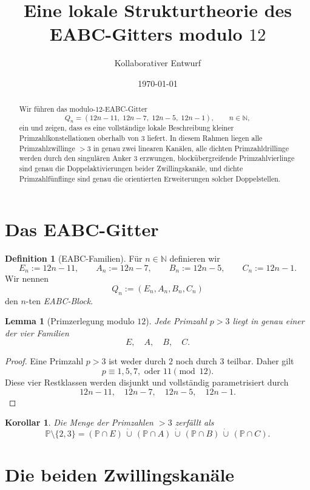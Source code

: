 \documentclass[11pt,a4paper]{article}
\title{Eine lokale Strukturtheorie des EABC-Gitters modulo \(12\)}
\author{Kollaborativer Entwurf}
\date{\today}
\newtheorem{lemma}[theorem]{Lemma}
\newtheorem{corollary}[theorem]{Korollar}
\theoremstyle{definition}
\newtheorem{definition}[theorem]{Definition}
\theoremstyle{remark}
\newcommand{\N}{\mathbb{N}}
\newcommand{\PP}{\mathbb{P}}
\begin{document}
	\maketitle
	
	\begin{abstract}
		Wir führen das modulo-\(12\)-EABC-Gitter
		\[
		Q_n=(12n-11,\;12n-7,\;12n-5,\;12n-1),
		\qquad n\in\N,
		\]
		ein und zeigen, dass es eine vollständige lokale Beschreibung kleiner Primzahlkonstellationen oberhalb von \(3\) liefert.
		In diesem Rahmen liegen alle Primzahlzwillinge \(>3\) in genau zwei linearen Kanälen, alle dichten Primzahldrillinge werden durch den singulären Anker \(3\) erzwungen, blockübergreifende Primzahlvierlinge sind genau die Doppelaktivierungen beider Zwillingskanäle, und dichte Primzahlfünflinge sind genau die orientierten Erweiterungen solcher Doppelstellen.
	\end{abstract}
	
	\section{Das EABC-Gitter}
	
	\begin{definition}[EABC-Familien]
		Für \(n\in\N\) definieren wir
		\[
		E_n:=12n-11,\qquad
		A_n:=12n-7,\qquad
		B_n:=12n-5,\qquad
		C_n:=12n-1.
		\]
		Wir nennen
		\[
		Q_n:=(E_n,A_n,B_n,C_n)
		\]
		den \(n\)-ten \emph{EABC-Block}.
	\end{definition}
	
	\begin{lemma}[Primzerlegung modulo \(12\)]
		Jede Primzahl \(p>3\) liegt in genau einer der vier Familien
		\[
		E,\quad A,\quad B,\quad C.
		\]
	\end{lemma}
	
	\begin{proof}
		Eine Primzahl \(p>3\) ist weder durch \(2\) noch durch \(3\) teilbar. Daher gilt
		\[
		p\equiv 1,5,7,\text{ oder }11 \pmod{12}.
		\]
		Diese vier Restklassen werden disjunkt und vollständig parametrisiert durch
		\[
		12n-11,\quad 12n-7,\quad 12n-5,\quad 12n-1.
		\]
	\end{proof}
	
	\begin{corollary}
		Die Menge der Primzahlen \(>3\) zerfällt als
		\[
		\PP\setminus\{2,3\}
		=
		(\PP\cap E)\,\dot\cup\,(\PP\cap A)\,\dot\cup\,(\PP\cap B)\,\dot\cup\,(\PP\cap C).
		\]
	\end{corollary}
	
	\section{Die beiden Zwillingskanäle}
	
\end{document}
